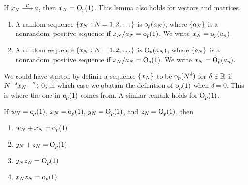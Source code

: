\documentclass[11pt, oneside, a4paper, article]{article}
\numberwithin{equation}{section}
\begin{document}
\begin{lem}
If $x_{N}  \overset{p}{\longrightarrow}  a$, then $x_{N} = \text{O}_{p}(1)$.
This lemma also holds for vectors and matrices.
\end{lem}

\vspace{1 em}
\begin{defn}
\item
\begin{enumerate}
\item 
A random sequence $\{x_{N} : N = 1, 2, \dots\}$ is $\text{o}_{p}(a_{N})$, where $\{a_{N}\}$ is a nonrandom, positive sequence if $x_{N}/a_{N} = \text{o}_{p}(1)$.
We write $x_{N} = \text{o}_{p}(a_{n})$.

\item 
A random sequence $\{x_{N} : N = 1, 2, \dots\}$ is $\text{O}_{p}(a_{N})$, where $\{a_{N}\}$ is a nonrandom, positive sequence if $x_{N}/a_{N} = \text{O}_{p}(1)$.
We write $x_{N} = \text{O}_{p}(a_{n})$.
\end{enumerate}
\end{defn}

\begin{remark}
We could have started by definin a sequence $\{x_{N}\}$ to be $\text{o}_{p}(N^{\delta})$ for $\delta \in \mathbb{R}$ if $N^{-\delta} x_{N}  \overset{p}{\longrightarrow}  0$, in which case we obatain the definition of $\text{o}_{p}(1)$ when $\delta = 0$.
This is where the one in $\text{o}_{p}(1)$ comes from.
A similar remark holds for $\text{O}_{p}(1)$.
\end{remark}

\begin{lem}
	If $w_{N} = \text{o}_{p}(1)$, $x_{N} = \text{o}_{p}(1)$, $y_{N} = \text{O}_{p}(1)$, and $z_{N} = \text{O}_{p}(1)$, then

\vspace{-1 ex}
\begin{enumerate}[noitemsep]
\item $w_{N} + x_{N} = \text{o}_{p}(1)$

\item $y_{N} + z_{N} = \text{O}_{p}(1)$

\item $y_{N} z_{N} = \text{O}_{p}(1)$

\item $x_{N} z_{N} = \text{o}_{p}(1)$
\end{enumerate}

\end{lem}
\end{document}
